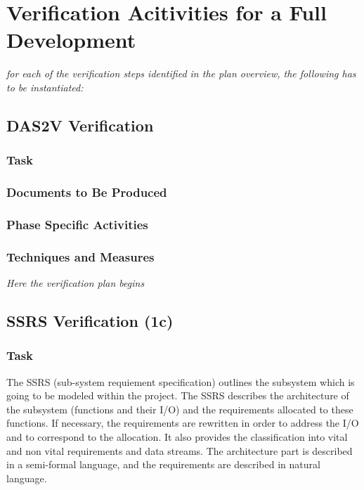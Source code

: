 \section{Verification Acitivities for a Full Development}
\label{sec:verif-full-devel}

\textit{for each of the verification steps identified in the plan
  overview, the following has to be instantiated: }
\subsection{DAS2V Verification}
\label{sec:dasv-verification}

\subsubsection{Task}
\label{sec:dasv-verif-task}

\subsubsection{Documents to Be Produced}
\label{sec:dasv-verif-docum-be-prod}

\subsubsection{Phase Specific Activities}
\label{sec:dasv-verif-phase-spec-activ}

\subsubsection{Techniques and Measures}
\label{sec:dasv-verif-techniques-measures}

\textit{Here the verification plan begins}

\subsection{SSRS Verification (1c)}
\label{sec:ssrs-verification}

\subsubsection{Task}
\label{sec:ssrs-verif-task}

The SSRS (sub-system requiement specification) outlines the subsystem
which is going to be modeled within the project. The SSRS describes
the architecture of the subsystem (functions and their I/O) and the
requirements allocated to these functions. If necessary, the
requirements are rewritten in order to address the I/O and to
correspond to the allocation. It also provides the classification into
vital and non vital requirements and data
streams. The architecture part is described in a semi-formal language,
and the requirements are described in natural language.

